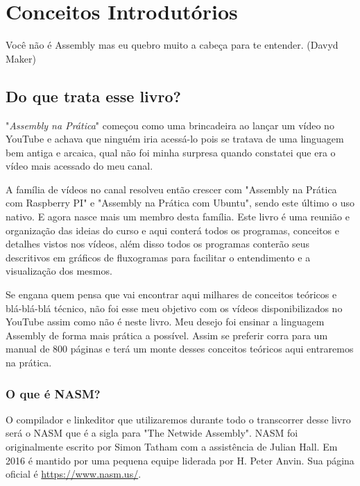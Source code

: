 \chapter{Conceitos Introdutórios}

\begin{remark}
Você não é Assembly mas eu quebro muito a cabeça para te entender. (Davyd Maker) 
\end{remark}

\section{Do que trata esse livro?}

"\textit{Assembly na Prática}" começou como uma brincadeira ao lançar um vídeo no YouTube e achava que ninguém iria acessá-lo pois se tratava de uma linguagem bem antiga e arcaica, qual não foi minha surpresa quando constatei que era o vídeo mais acessado do meu canal.

A família de vídeos no canal resolveu então crescer com "Assembly na Prática com Raspberry PI" e "Assembly na Prática com Ubuntu", sendo este último o uso nativo. E agora nasce mais um membro desta família. Este livro é uma reunião e organização das ideias do curso e aqui conterá todos os programas, conceitos e detalhes vistos nos vídeos, além disso todos os programas conterão seus descritivos em gráficos de fluxogramas para facilitar o entendimento e a visualização dos mesmos.

Se engana quem pensa que vai encontrar aqui milhares de conceitos teóricos e blá-blá-blá técnico, não foi esse meu objetivo com os vídeos disponibilizados no YouTube assim como não é neste livro. Meu desejo foi ensinar a linguagem Assembly de forma mais prática a possível. Assim se preferir corra para um manual de 800 páginas e terá um monte desses conceitos teóricos aqui entraremos na prática.

\subsection{O que é NASM?}

O compilador e linkeditor que utilizaremos durante todo o transcorrer desse livro será o NASM que é a sigla para "The Netwide Assembly". NASM foi originalmente escrito por Simon Tatham com a assistência de Julian Hall. Em 2016 é mantido por uma pequena equipe liderada por H. Peter Anvin. Sua página oficial é \url{https://www.nasm.us/}.

